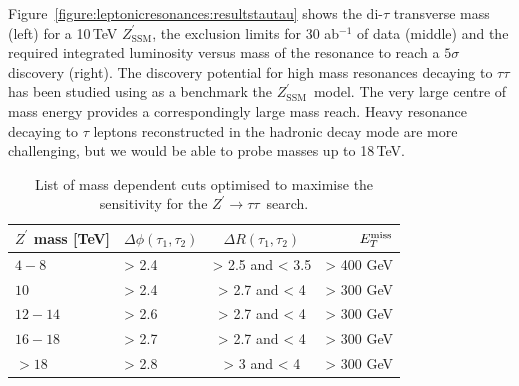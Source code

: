 \documentclass[a4paper,11pt]{article}
\newcommand{\Zp}{\ensuremath{Z^{\prime}}}
\newcommand{\ZpSSM}{\ensuremath{Z^{\prime}_{\mathrm{SSM}}}}
\newcommand*{\Zptata}{\ensuremath{Z^{\prime}\rightarrow \tau\tau}}
\newcommand*{\met}{\ensuremath{E_{T}^{\rm{miss}}}}
\begin{document}
Figure~\ref{figure:leptonicresonances:resultstautau} shows the di-$\tau$ transverse mass (left) for a 10\,TeV \ZpSSM, the exclusion limits for 30 ab$^{-1}$ of data (middle) and the required integrated luminosity versus mass of the resonance to reach a $5\sigma$ discovery (right).
The discovery potential for high mass resonances decaying to $\tau\tau$ has been studied using as a benchmark the \ZpSSM\ model. The very large centre of mass energy provides a correspondingly large mass reach. Heavy resonance decaying to $\tau$ leptons reconstructed in the hadronic decay mode are more challenging, but we would be able to probe masses up to 18\,TeV.

\begin{table}[htbp]
   \centering
\begin{tabular}{|l|l|c|r|}
  \hline
  \hline
   $\Zp$ mass [TeV] &  $\Delta \phi(\tau_1, \tau_2)$&  $\Delta R(\tau_1, \tau_2)$ & $\met$\\
  \hline
  $4-8$ & > 2.4 & > 2.5 and < 3.5 & > 400 GeV\\
  $10$ & > 2.4 & > 2.7 and < 4 & > 300 GeV\\
  $12-14$ & > 2.6 & > 2.7 and < 4 & > 300 GeV\\
  $16-18$ & > 2.7 & > 2.7 and < 4 & > 300 GeV\\
  $>18$ & > 2.8 & > 3 and < 4 & > 300 GeV\\
  \hline
  \hline
  \end{tabular}
  \caption{List of mass dependent cuts optimised to maximise the sensitivity for the \Zptata\ search.}
  \label{tab:leptonicresonances:selectiontautau}
\end{table}
\end{document}
